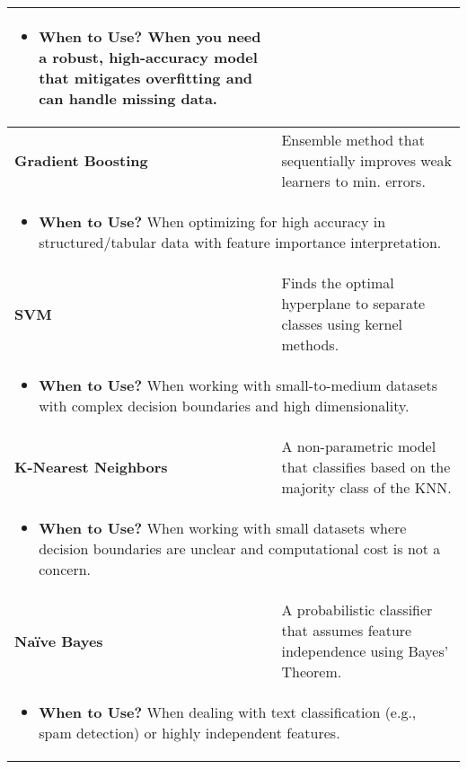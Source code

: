 \documentclass{article}
\begin{document}
\begin{summary}
\begin{center}
\begin{tabular}{ll}
{\begin{itemize}
            \item \textbf{When to Use?} When you need a robust, high-accuracy model that mitigates overfitting and can handle missing data.
        \end{itemize}} \\
        \midrule
        \textbf{Gradient Boosting} & Ensemble method that sequentially improves weak learners to min. errors. \\
        \multicolumn{2}{p{\linewidth}}{
        \begin{itemize}
            \item \textbf{When to Use?} When optimizing for high accuracy in structured/tabular data with feature importance interpretation.
        \end{itemize}} \\
        \midrule
        \textbf{SVM} & Finds the optimal hyperplane to separate classes using kernel methods. \\
        \multicolumn{2}{p{\linewidth}}{
        \begin{itemize}
            \item \textbf{When to Use?} When working with small-to-medium datasets with complex decision boundaries and high dimensionality.
        \end{itemize}} \\
        \midrule
        \textbf{K-Nearest Neighbors} & A non-parametric model that classifies based on the majority class of the KNN. \\
        \multicolumn{2}{p{\linewidth}}{
        \begin{itemize}
            \item \textbf{When to Use?} When working with small datasets where decision boundaries are unclear and computational cost is not a concern.
        \end{itemize}} \\
        \midrule
        \textbf{Naïve Bayes} & A probabilistic classifier that assumes feature independence using Bayes’ Theorem. \\
        \multicolumn{2}{p{\linewidth}}{
        \begin{itemize}
            \item \textbf{When to Use?} When dealing with text classification (e.g., spam detection) or highly independent features.
        \end{itemize}} \\
        \bottomrule
        \end{tabular}
    \end{center}
\end{summary}
\newpage
\end{document}
